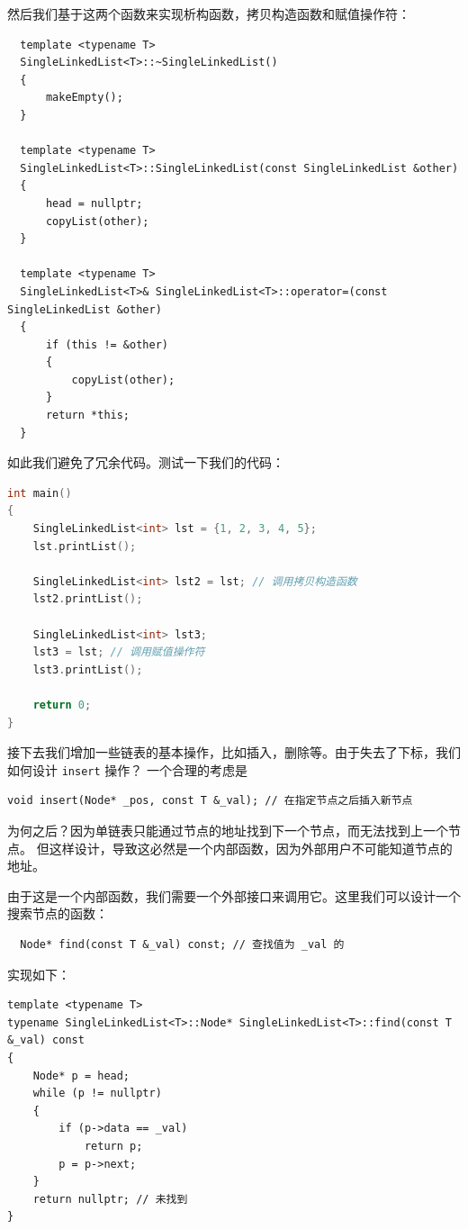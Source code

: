 \documentclass[a4paper]{ctexart}
\theoremstyle{definition}
\theoremstyle{definition}
\begin{document}
然后我们基于这两个函数来实现析构函数，拷贝构造函数和赋值操作符：

\begin{lstlisting}
  template <typename T>
  SingleLinkedList<T>::~SingleLinkedList()
  {
      makeEmpty();
  }  

  template <typename T>
  SingleLinkedList<T>::SingleLinkedList(const SingleLinkedList &other)
  {
      head = nullptr;
      copyList(other);
  }

  template <typename T>
  SingleLinkedList<T>& SingleLinkedList<T>::operator=(const SingleLinkedList &other)
  {
      if (this != &other)
      {
          copyList(other);
      }
      return *this;
  }
\end{lstlisting}

如此我们避免了冗余代码。测试一下我们的代码：

\begin{lstlisting}[language=c++]
int main()
{
    SingleLinkedList<int> lst = {1, 2, 3, 4, 5};
    lst.printList();

    SingleLinkedList<int> lst2 = lst; // 调用拷贝构造函数
    lst2.printList();

    SingleLinkedList<int> lst3;
    lst3 = lst; // 调用赋值操作符
    lst3.printList();

    return 0;
}
\end{lstlisting}

接下去我们增加一些链表的基本操作，比如插入，删除等。由于失去了下标，我们如何设计 \verb|insert| 操作？
一个合理的考虑是 
\begin{lstlisting}[]
  void insert(Node* _pos, const T &_val); // 在指定节点之后插入新节点
\end{lstlisting}
为何之后？因为单链表只能通过节点的地址找到下一个节点，而无法找到上一个节点。
但这样设计，导致这必然是一个内部函数，因为外部用户不可能知道节点的地址。


由于这是一个内部函数，我们需要一个外部接口来调用它。这里我们可以设计一个搜索节点的函数：
\begin{lstlisting}
  Node* find(const T &_val) const; // 查找值为 _val 的
\end{lstlisting}
实现如下：
\begin{lstlisting}
template <typename T>
typename SingleLinkedList<T>::Node* SingleLinkedList<T>::find(const T &_val) const
{
    Node* p = head;
    while (p != nullptr)
    {
        if (p->data == _val)
            return p;
        p = p->next;
    }
    return nullptr; // 未找到
}
\end{lstlisting}
\end{document}

